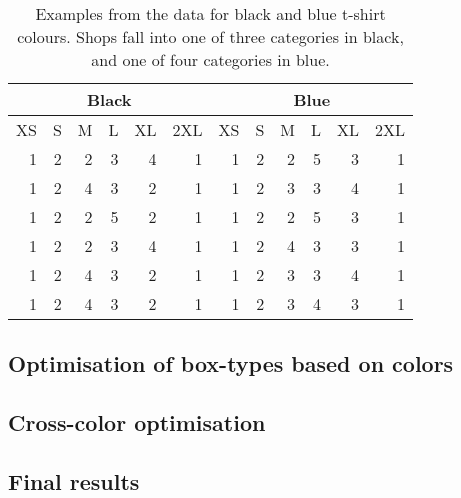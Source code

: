 \documentclass{beamer}
\begin{document}
\begin{frame}
\begin{table}[htbp]
\begin{center}
\begin{tabular}{|r|r|r|r|r|r|r|r|r|r|r|r|}
\hline
\multicolumn{6}{|c|}{Black} & \multicolumn{6}{|c|}{Blue} \\ \hline
\multicolumn{1}{|l|}{XS} & \multicolumn{1}{l|}{S} & \multicolumn{1}{l|}{M} & \multicolumn{1}{l|}{L} & \multicolumn{1}{l|}{XL} & \multicolumn{1}{l|}{2XL} & \multicolumn{1}{l|}{XS} & \multicolumn{1}{l|}{S} & \multicolumn{1}{l|}{M} & \multicolumn{1}{l|}{L} & \multicolumn{1}{l|}{XL} & \multicolumn{1}{l|}{2XL} \\ \hline
1 & 2 & 2 & 3 & 4 & 1 & 1 & 2 & 2 & 5 & 3 & 1 \\ \hline
1 & 2 & 4 & 3 & 2 & 1 & 1 & 2 & 3 & 3 & 4 & 1 \\ \hline
1 & 2 & 2 & 5 & 2 & 1 & 1 & 2 & 2 & 5 & 3 & 1 \\ \hline
1 & 2 & 2 & 3 & 4 & 1 & 1 & 2 & 4 & 3 & 3 & 1 \\ \hline
1 & 2 & 4 & 3 & 2 & 1 & 1 & 2 & 3 & 3 & 4 & 1 \\ \hline
1 & 2 & 4 & 3 & 2 & 1 & 1 & 2 & 3 & 4 & 3 & 1 \\ \hline
\end{tabular}
\end{center}
\caption{Examples from the data for black and blue t-shirt colours. Shops fall into one of three categories in black, and one of four categories in blue.}
\label{}
\end{table}
\end{frame}

\subsection{Optimisation of box-types based on colors}


\subsection{Cross-color optimisation}


\subsection{Final results}

\end{document}
